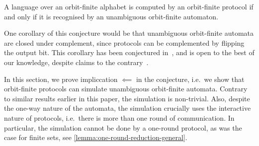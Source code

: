 \begin{conjecture}
    \label{conj:protocols-unambiguous} A language over an orbit-finite alphabet is computed by an orbit-finite protocol if and only if it is recognised by an unambiguous orbit-finite automaton.
\end{conjecture}

One corollary of this conjecture would be that unambiguous orbit-finite automata are closed under complement, since protocols can be complemented by flipping the output bit. This corollary has been conjectured in~\cite[p.9]{colcombet2012forms}, and is open to the best of our knowledge, despite claims to the contrary~\cite[Footnote 5]{colcombet2015unambiguity}.

In this section, we prove impliccation $\impliedby$ in the conjecture, i.e.~we show that orbit-finite protocols can simulate  unambiguous orbit-finite automata. Contrary to similar results earlier in this paper, the simulation is non-trivial. Also, despite the one-way nature of the automata, the simulation crucially uses  the interactive nature of protocols, i.e.~there is more than one round of communication. In particular, the simulation cannot be done by a one-round protocol, as was the case for finite sets, see \cref{lemma:one-round-reduction-general}.

